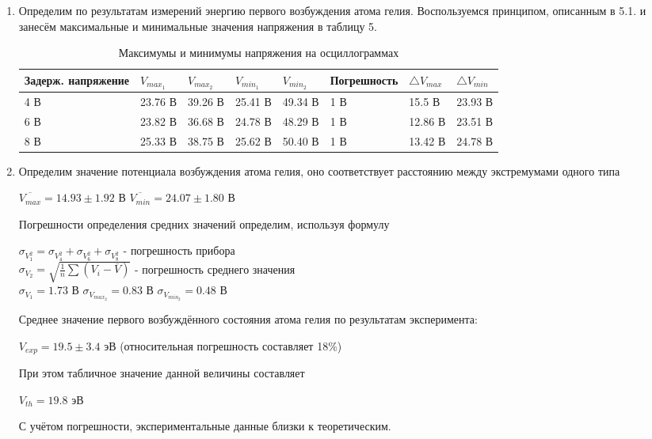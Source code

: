 \documentclass[a4paper, 12pt]{article}
\begin{document}
\begin{enumerate}
\item Определим по результатам измерений энергию первого возбуждения атома гелия. Воспользуемся принципом, описанным в 5.1. и занесём максимальные и минимальные значения напряжения в таблицу 5.

\begin{table}[h]
    \centering
    \begin{center}
    \caption{Максимумы и минимумы напряжения на осциллограммах}
    \end{center}
    \vspace{0.1cm}
    \label{tab:my_label}
    \begin{tabular}{ |p{3.5cm}||p{1.5cm}|p{1.5cm}|p{1.5cm}|p{1.5cm}|p{2.5cm}|p{1.5cm}|p{1.5cm}|}
 \hline
Задерж. напряжение & $V_{max_1}$ & $V_{max_2}$ & $V_{min_1}$ & $V_{min_2}$ & Погрешность & $\triangle V_{max}$ & $\triangle V_{min}$\\
 \hline
 4 В & 23.76 В & 39.26 В & 25.41 В & 49.34 В & 1 В & 15.5 В & 23.93 В\\
\hline
 6 В & 23.82 В & 36.68 В & 24.78 В & 48.29 В & 1 В & 12.86 В & 23.51 В\\
\hline
 8 В & 25.33 В & 38.75 В & 25.62 В & 50.40 В & 1 В & 13.42 В & 24.78 В\\
\hline

\end{tabular}
\end{table} 

\item Определим значение потенциала возбуждения атома гелия, оно соответствует расстоянию между экстремумами одного типа
\begin{center}
    $\overline{V_{max}} = 14.93 \pm 1.92$ В \hspace{1cm} $\overline{V_{min}} = 24.07 \pm 1.80$ В
\end{center}
Погрешности определения средних значений определим, используя формулу
\begin{center}
    $\sigma_{V^2_1} = \sigma_{V_4^2} + \sigma_{V_6^2} + \sigma_{V_8^2}$ - погрешность прибора \\
    $\sigma_{V_2} = \sqrt{\frac{1}{n}\sum (V_i - \overline{V})}$ -  погрешность среднего значения \\
    $\sigma_{V_1} = 1.73$ В \hspace{1cm} $\sigma_{V_{{max}_2}} = 0.83 $ В  \hspace{1cm} $\sigma_{V_{{min}_2}} = 0.48$ В
\end{center}

Среднее значение первого возбуждённого состояния атома гелия по результатам эксперимента:
\begin{center}
    $V_{exp} = 19.5 \pm 3.4$ эВ (относительная погрешность составляет 18\%)
\end{center}
При этом табличное значение данной величины составляет
\begin{center}
    $V_{th} = 19.8$ эВ
\end{center}
С учётом погрешности, экспериментальные данные близки к теоретическим.

\end{enumerate}    
\end{document}
